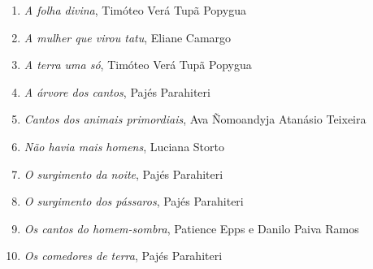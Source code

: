 \begin{enumerate}
\setlength\parskip{4.2pt}
\setlength\itemsep{-1.4mm}
\item \textit{A folha divina}, Timóteo Verá Tupã Popygua
\item \textit{A mulher que virou tatu}, Eliane Camargo
\item \textit{A terra uma só}, Timóteo Verá Tupã Popygua
\item \textit{A árvore dos cantos}, Pajés Parahiteri
\item \textit{Cantos dos animais primordiais}, Ava Ñomoandyja Atanásio Teixeira
\item \textit{Não havia mais homens}, Luciana Storto
\item \textit{O surgimento da noite}, Pajés Parahiteri
\item \textit{O surgimento dos pássaros}, Pajés Parahiteri
\item \textit{Os cantos do homem-sombra}, Patience Epps e Danilo Paiva Ramos
\item \textit{Os comedores de terra}, Pajés Parahiteri
\end{enumerate}



